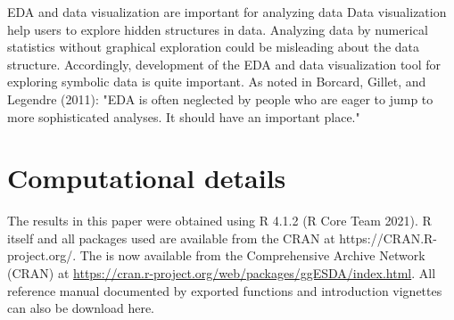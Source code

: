 \documentclass[article]{jss}
\begin{document}
EDA and data visualization are important for analyzing data Data
visualization help users to explore hidden structures in data.
Analyzing data by numerical statistics without graphical exploration
could be misleading about the data structure. Accordingly, development
of the EDA and data visualization tool for exploring symbolic data is
quite important. As noted in Borcard, Gillet, and Legendre (2011):
"EDA is often neglected by people who are eager to jump to more
sophisticated analyses. It should have an important place."






\section*{Computational details}
The results in this paper were obtained using R 4.1.2 (R Core Team 2021). R itself and all
packages used are available from the CRAN at https://CRAN.R-project.org/.
The  is now available from the Comprehensive 
Archive Network (CRAN) at
\url{https://cran.r-project.org/web/packages/ggESDA/index.html}. All
reference manual documented by exported functions and introduction
vignettes can also be download here.



\end{document}
